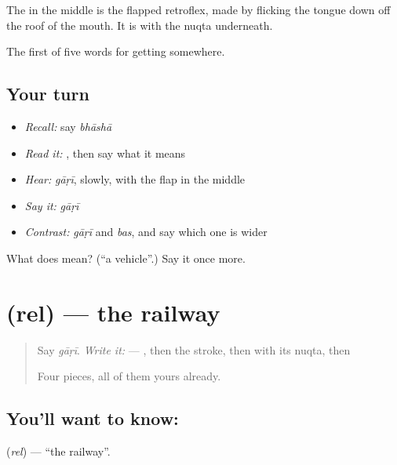 The  in the middle is the flapped retroflex, made by flicking the tongue down off the roof of the mouth. It is  with the nuqta underneath.

\begin{grammarlens}[title={What you've built}]
The first of five words for getting somewhere.
\end{grammarlens}

\subsection*{Your turn}
\begin{itemize}
\raggedright
  \item \emph{Recall:} say \emph{bhāshā}
  \item \emph{Read it:} \textbf{}, then say what it means
  \item \emph{Hear:} \emph{gāṛī}, slowly, with the flap in the middle
  \item \emph{Say it:} \emph{gāṛī}
  \item \emph{Contrast:} \emph{gāṛī} and \emph{bas}, and say which one is wider
\end{itemize}

\begin{tcolorbox}[breakable,colback=teal!4,colframe=teal!35!black,title={Before you move on}]
What does  mean? (\textquotedblleft{}a vehicle\textquotedblright{}.) Say it once more.
\end{tcolorbox}
\section[\texorpdfstring{\hi{रेल} (rel)}{रेल (rel)}]{ (rel) — the railway}

\label{lesson:HI-C69-railway}



\begin{quote}
Say \emph{gāṛī}. \emph{Write it:} \textbf{} — , then the  stroke, then  with its nuqta, then 

Four pieces, all of them yours already.
\end{quote}

\subsection*{You'll want to know: }
\textbf{} (\emph{rel}) — \textquotedblleft{}the railway\textquotedblright{}.

